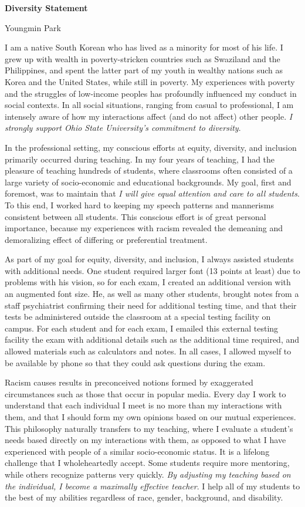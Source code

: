 \documentclass[a4paper,11pt]{article}
\begin{document}
\begin{center}
\Large \textbf{Diversity Statement}

\Large Youngmin Park
\end{center}

I am a native South Korean who has lived as a minority for most of his life. I grew up with wealth in poverty-stricken countries such as Swaziland and the Philippines, and spent the latter part of my youth in wealthy nations such as Korea and the United States, while still in poverty. My experiences with poverty and the struggles of low-income peoples has profoundly influenced my conduct in social contexts. In all social situations, ranging from casual to professional, I am intensely aware of how my interactions affect (and do not affect) other people. \textit{I strongly support Ohio State University's commitment to diversity}.

In the professional setting, my conscious efforts at equity, diversity, and inclusion primarily occurred during teaching. In my four years of teaching, I had the pleasure of teaching hundreds of students, where classrooms often consisted of a large variety of socio-economic and educational backgrounds. My goal, first and foremost, was to maintain that \textit{I will give equal attention and care to all students}. To this end, I worked hard to keeping my speech patterns and mannerisms consistent between all students. This conscious effort is of great personal importance, because my experiences with racism revealed the demeaning and demoralizing effect of differing or preferential treatment.

As part of my goal for equity, diversity, and inclusion, I always assisted students with additional needs. One student required larger font (13 points at least) due to problems with his vision, so for each exam, I created an additional version with an augmented font size. He, as well as many other students, brought notes from a staff psychiatrist confirming their need for additional testing time, and that their tests be administered outside the classroom at a special testing facility on campus. For each student and for each exam, I emailed this external testing facility the exam with additional details such as the additional time required, and allowed materials such as calculators and notes. In all cases, I allowed myself to be available by phone so that they could ask questions during the exam.

Racism causes results in preconceived notions formed by exaggerated circumstances such as those that occur in popular media. Every day I work to understand that each individual I meet is no more than my interactions with them, and that I should form my own opinions based on our mutual experiences. This philosophy naturally transfers to my teaching, where I evaluate a student's needs based directly on my interactions with them, as opposed to what I have experienced with people of a similar socio-economic status. It is a lifelong challenge that I wholeheartedly accept. Some students require more mentoring, while others recognize patterns very quickly. \textit{By adjusting my teaching based on the individual, I become a maximally effective teacher}. I help all of my students to the best of my abilities regardless of race, gender, background, and disability.
\end{document}
